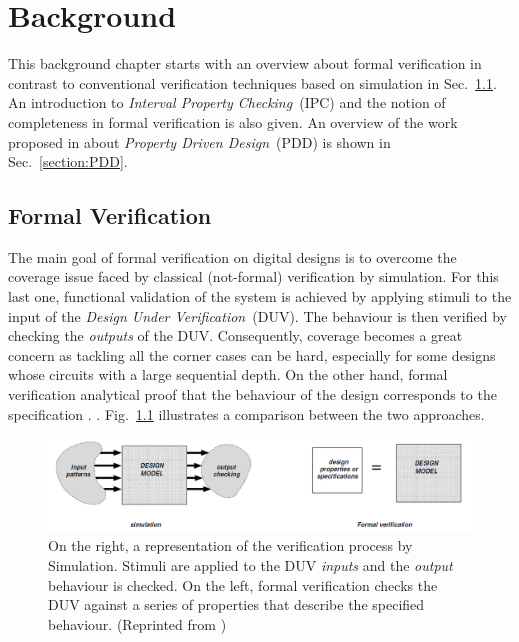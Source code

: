\chapter{Background}

This background chapter starts with an overview about formal verification in contrast to conventional verification techniques based on simulation in Sec.~\ref{section:formal-verification}. An introduction to \textit{Interval Property Checking}~(IPC) and the notion of completeness in formal verification is also given. An overview of the work proposed in \cite{paper-pdd} about \textit{Property Driven Design}~(PDD) is shown in Sec.~\ref{section:PDD}.

\section{Formal Verification}
\label{section:formal-verification}

The main goal of formal verification on digital designs is to overcome the coverage issue faced by classical (not-formal) verification by simulation. For this last one, functional validation of the system is achieved by applying stimuli to the input of the \textit{Design Under Verification}~(DUV). The behaviour is then verified by checking the \textit{outputs} of the DUV. Consequently, coverage becomes a great concern as tackling all the corner cases can be hard, especially for some designs whose circuits with a large sequential depth. On the other hand, formal verification  analytical proof that the behaviour of the design corresponds to the specification . \cite{thesis-formal}. Fig.~\ref{fig:sim-vs-formal} illustrates a comparison between the two approaches.

\begin{figure}[htb!]
	\centering
	\includegraphics[width=\textwidth]{images/sim_vs_formal.PNG}
	\caption{On the right, a representation of the verification process by Simulation. Stimuli are applied to the DUV \textit{inputs} and the \textit{output} behaviour is checked. On the left, formal verification checks the DUV against a series of properties that describe the specified behaviour. (Reprinted from \cite{thesis-formal})}
	\label{fig:sim-vs-formal}
\end{figure}

